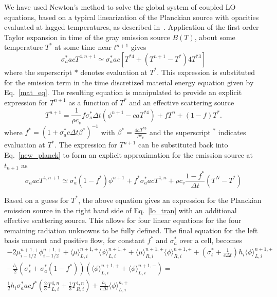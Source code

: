 \documentclass{mc2013}
\newcommand{\mom}[1]{\langle #1 \rangle}
\begin{document}
We have used Newton's method to solve the global system of coupled LO
equations, based on a typical linearization of the Planckian source with opacities
evaluated at lagged temperatures, as described in~\cite{morel_newton}.  Application of the first order Taylor expansion in time of the
gray emission source $B(T)$, about some temperature $T^*$ at some
time near $t^{n+1}$ gives
\begin{equation}\label{new_planck}
    \sigma_a^* a c T^{4,n+1} \simeq \sigma_a^* a c \left[T^{*4} + (T^{n+1} - T^*) 4T^{*3} \right]
\end{equation}
where the superscript $*$ denotes evaluation at $T^*$. This expression is substituted for the
emission term in the time discretized material
energy equation given by Eq.~\eqref{mat_eq}.  The resulting equation is manipulated
to provide an explicit expression for $T^{n+1}$ as a
function of $T^*$ and an effective scattering source
\begin{equation}
\label{lo_t_new}
T^{n+1}  = \frac{1}{\rho c_v } f\sigma_a^* \Delta t \left( \phi^{n+1} - c a T^{*4} \right)
+ f T^n + (1-f) T^*.
\end{equation}
where $f^* = (1 + \sigma_a^* c \Delta t \beta^*)^{-1}$ with
$\beta^* = \frac{4 a T^{*3}}{\rho c_v}$ and the superscript $^*$ indicates evaluation
at $T^*$. The
expression for $T^{n+1}$ can be substituted back into Eq.~\eqref{new_planck} to form
an explicit approximation for the emission source at $t_{n+1}$ as
\begin{equation}\label{t_next1}
    \sigma_a a c T^{4,n+1} \simeq \sigma_a^* (1 -f^*) \phi^{n+1}
    + f^* \sigma_a^* a c T^{4,n} + \rho c_v\frac{1-f^*}{\Delta t} (T^N - T^*)
\end{equation}

Based on a guess for $T^*$, the above equation gives an expression for
the Planckian emission source in the right hand side
of Eq.~\eqref{lo_tran} with an additional effective scattering source.
This allows for four linear equations for the four remaining radiation unknowns to be fully
defined.  The final equation for the left basis moment and positive flow, for constant
$f^*$ and $\sigma_a^*$ over a cell, becomes
\begin{multline}\label{lo_trans_fin}
    -2{\mu}_{i-1/2}^{n+1,+} \phi_{i-1/2}^{n+1,+} + \mom {\mu}_{L,i}^{n+1,+}
  \mom{\phi}_{L,i}^{n+1,+}
  +  \mom\mu_{R,i}^{n+1,+}
  \mom{\phi}_{R,i}^{n+1,+} +  \left(\sigma_t^*+\frac{1}{c \Delta t} \right) h_i 
  \mom{\phi}_{L,i}^{n+1,+} \\- \frac{h_i}{2}\left(\sigma_s^* + \sigma_a^*(1-f^*)\right)
  \left( \mom{\phi}_{L,i}^{n+1,+} +
  \mom\phi_{L,i}^{n+1,-}\right) = \\ \frac{1}{2} h_i \sigma_a^*a c f^* \left(\frac{2}{3} T_{L,i}^{4,n} +
  \frac{1}{3} T_{R,i}^{4,n} \right) + 
  \frac{h_i}{c\Delta t}\mom{\phi}_{L,i}^{n,+}
\end{multline}
\end{document}
